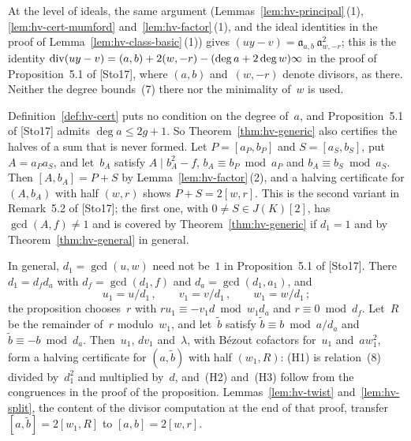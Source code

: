 At the level of ideals, the same argument (Lemmas~\ref{lem:hv-principal}\,(1),
\ref{lem:hv-cert-mumford} and~\ref{lem:hv-factor}\,(1), and the ideal identities in the proof of
Lemma~\ref{lem:hv-class-basic}\,(1)) gives
$(uy - v) = \mathfrak a_{a,b}\,\mathfrak a_{w,-r}^2$; this is the identity
$\operatorname{div}(uy - v) = (a, b) + 2(w, -r) - (\deg a + 2\deg w)\infty$ in the proof of
Proposition~5.1 of [Sto17], where $(a, b)$ and~$(w, -r)$ denote divisors, as there. Neither the
degree bounds~(7) there nor the minimality of~$w$ is used.

\begin{remark}
\label{rem:hv-sums}
Definition~\ref{def:hv-cert} puts no condition on the degree of~$a$, and Proposition~5.1
of [Sto17] admits $\deg a \le 2g + 1$. So Theorem~\ref{thm:hv-generic} also certifies the halves
of a sum that is never formed. Let $P = [a_P, b_P]$ and $S = [a_S, b_S]$, put $A = a_P a_S$, and
let~$b_A$ satisfy $A \mid b_A^2 - f$, $b_A \equiv b_P \bmod a_P$ and $b_A \equiv b_S \bmod a_S$.
Then $[A, b_A] = P + S$ by Lemma~\ref{lem:hv-factor}\,(2), and a halving certificate for
$(A, b_A)$ with half $(w, r)$ shows $P + S = 2[w, r]$. This is the second variant in Remark~5.2
of [Sto17]; the first one, with $0 \ne S \in J(K)[2]$, has $\gcd(A, f) \ne 1$ and is covered by
Theorem~\ref{thm:hv-generic} if $d_1 = 1$ and by Theorem~\ref{thm:hv-general} in general.
\end{remark}

In general, $d_1 = \gcd(u, w)$ need not be~$1$ in Proposition~5.1 of [Sto17]. There
$d_1 = d_f d_a$ with $d_f = \gcd(d_1, f)$ and $d_a = \gcd(d_1, a_1)$, and
\[ u_1 = u/d_1\,, \qquad v_1 = v/d_1\,, \qquad w_1 = w/d_1\,; \]
the proposition chooses~$r$ with $r u_1 \equiv -v_1 d \bmod w_1 d_a$ and $r \equiv 0 \bmod d_f$.
Let~$R$ be the remainder of~$r$ modulo~$w_1$, and let~$\tilde b$ satisfy
$\tilde b \equiv b \bmod a/d_a$ and $\tilde b \equiv -b \bmod d_a$. Then~$u_1$, $d v_1$
and~$\lambda$, with B\'ezout cofactors for~$u_1$ and~$a w_1^2$, form a halving certificate for
$(a, \tilde b)$ with half $(w_1, R)$: (H1) is relation~(8) divided by~$d_1^2$ and multiplied
by~$d$, and~(H2) and~(H3) follow from the congruences in the proof of the proposition.
Lemmas~\ref{lem:hv-twist} and~\ref{lem:hv-split}, the content of the divisor computation at the
end of that proof, transfer $[a, \tilde b] = 2[w_1, R]$ to $[a, b] = 2[w, r]$.

